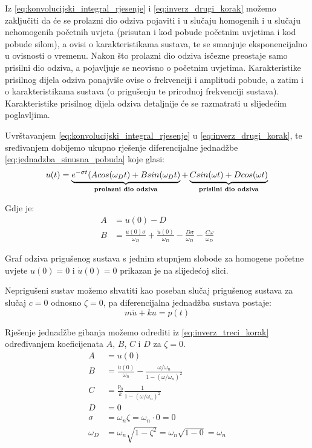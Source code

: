 Iz \eqref{eq:konvolucijski_integral_rjesenje} i \eqref{eq:inverz_drugi_korak} možemo
zaključiti da će se prolazni dio odziva pojaviti i u slučaju homogenih i u slučaju
nehomogenih početnih uvjeta (prisutan i kod pobude početnim uvjetima i kod pobude
silom), a ovisi o karakteristikama sustava,
te se smanjuje eksponencijalno u ovisnosti o vremenu. Nakon
što prolazni dio odziva isčezne preostaje samo prisilni dio odziva, a pojavljuje se
neovisno o početnim uvjetima. Karakteristike prisilnog dijela odziva ponajviše ovise
o frekvenciji i amplitudi pobude, a zatim i o karakteristikama sustava (o prigušenju
te prirodnoj frekvenciji sustava). Karakteristike prisilnog dijela odziva detaljnije će se
razmatrati u slijedećim poglavljima.

Uvrštavanjem \eqref{eq:konvolucijski_integral_rjesenje} u
\eqref{eq:inverz_drugi_korak}, te sređivanjem dobijemo ukupno rješenje
diferencijalne jednadžbe \eqref{eq:jednadzba_sinusna_pobuda} koje glasi:
\begin{equation}\label{eq:inverz_treci_korak}
	u(t)=\underbrace{
		e^{-\sigma t}(Acos(\omega_D t)+Bsin(\omega_Dt)
		}_{\text{\textbf{prolazni dio odziva}}}
		+
	     \underbrace{
		Csin(\omega t) + Dcos(\omega t)
		     }_{\text{\textbf{prisilni dio odziva}}}
\end{equation}

Gdje je:
\begin{align}
    A &= u(0)-D\label{eq:koef_A}\\
    B &= \frac{u(0)\sigma}{\omega_D}+
         \frac{\dot{u}(0)}{\omega_D}-
         \frac{D\sigma}{\omega_D}-
         \frac{C\omega}{\omega_D}\label{eq:koef_B}
\end{align}

Graf odziva prigušenog sustava s jednim stupnjem slobode za homogene početne
uvjete $u(0)=0$ i $\dot{u}(0)=0$ prikazan je na slijedećoj slici.

Neprigušeni sustav možemo shvatiti kao poseban slučaj prigušenog sustava za slučaj
$c=0$ odnosno $\zeta=0$, pa diferencijalna jednadžba sustava postaje:
\begin{equation}\label{eq:jednadzba_gibanja_nepriguseni_nesredjeno}
	m\ddot{u}+ku=p(t)
\end{equation}

Rješenje jednadžbe gibanja možemo odrediti iz \eqref{eq:inverz_treci_korak}
određivanjem koeficijenata $A$, $B$, $C$ i $D$ za $\zeta = 0$.
\begin{align}
    A &= u(0) \label{eq:np_koef_A}\\
    B &= \frac{\dot{u}(0)}{\omega_n}-\frac{\omega/\omega_n}{1-(\omega/\omega_n)^2}\label{eq:np_koef_B}\\
    C &= \frac{p_0}{k}\frac{1}{1-(\omega/\omega_n)^2}\label{eq:np_koef_C}\\
    D &= 0\label{eq:np_koef_D}\\
    \sigma &= \omega_n\zeta=\omega_n\cdot 0=0\label{eq:np_sigma}\\
    \omega_D &= \omega_n\sqrt{1-\zeta^2}=\omega_n\sqrt{1-0}=\omega_n\label{eq:np_omega_D}
\end{align}

